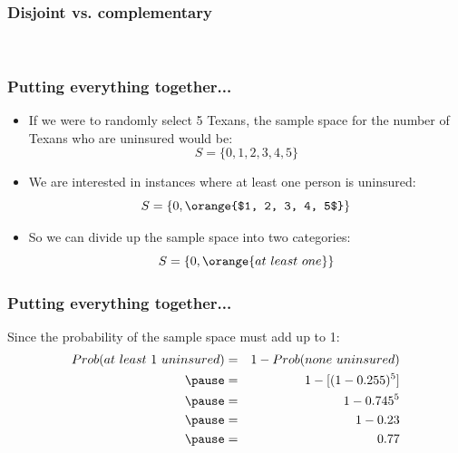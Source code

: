 \documentclass[11pt,containsverbatim,handout]{beamer}
\newcommand{\soln}[1]{ }
\begin{document}

\begin{frame}
\frametitle{Disjoint vs. complementary}


\pause

\soln{Not necessarily, there may be more than 2 events in the sample space, e.g. party affiliation.}

\pause
$\:$ \\


\pause

\soln{Yes, that's the definition of complementary, e.g. heads and tails. }

\end{frame}


\begin{frame}
\frametitle{Putting everything together...}


\begin{itemize}

\item If we were to randomly select 5 Texans, the sample space for the number of Texans who are uninsured would be:
\[ S = \{0, 1, 2, 3, 4, 5\} \]

\item We are interested in instances where at least one person is uninsured:
\[ S = \{0, \orange{$1, 2, 3, 4, 5$} \} \]

\item So we can divide up the sample space into two categories:
\[ S = \{0, \orange{at~least~one} \} \]

\end{itemize}

\end{frame}


\begin{frame}
\frametitle{Putting everything together...}

Since the probability of the sample space must add up to 1:
\begin{eqnarray*}
Prob(at~least~1~uninsured) &=& 1 - Prob(none~uninsured) \\
\pause
&=& 1 - [(1-0.255)^5] \\
\pause
&=& 1- 0.745^5 \\
\pause
&=& 1 - 0.23 \\
\pause
&=& 0.77
\end{eqnarray*}

$\:$ \\
$\:$ \\


\end{frame}
\end{document}
